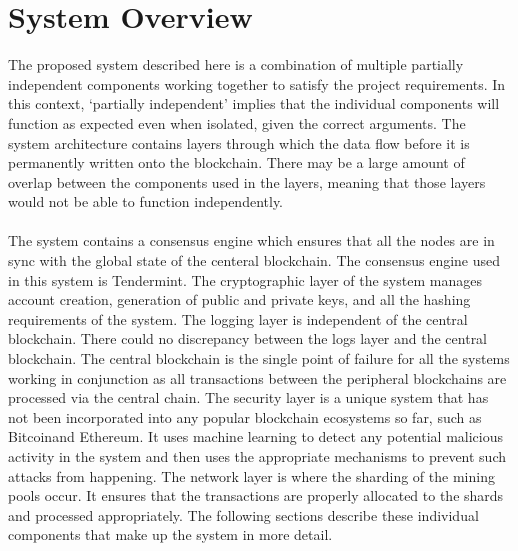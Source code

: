 \documentclass[a4paper,twoside,phd]{BYUPhys}
\begin{document}
\section{System Overview}
The proposed system described here is a combination of multiple partially independent components working together to satisfy the project requirements. In this context, `partially independent' implies that the individual components will function as expected even when isolated, given the correct arguments. The system architecture contains layers through which the data flow before it is permanently written onto the blockchain. There may be a large amount of overlap between the components used in the layers, meaning that those layers would not be able to function independently. 
\\
\\
The system contains a consensus engine which ensures that all the nodes are in sync with the global state of the centeral blockchain. The consensus engine used in this system is Tendermint. The cryptographic layer of the system manages account creation, generation of public and private keys, and all the hashing requirements of the system. The logging layer is independent of the central blockchain. There could no discrepancy between the logs layer and the central blockchain. The central blockchain is the single point of failure for all the systems working in conjunction as all transactions between the peripheral blockchains are processed via the central chain. The security layer is a unique system that has not been incorporated into any popular blockchain ecosystems so far, such as Bitcoin\cite{NakamotoBitcoin:System}and Ethereum\cite{ButerinAPLATFORM}. It uses machine learning to detect any potential malicious activity in the system and then uses the appropriate mechanisms to prevent such attacks from happening. The network layer is where the sharding of the mining pools occur. It ensures that the transactions are properly allocated to the shards and processed appropriately. The following sections describe these individual components that make up the system in more detail.
\end{document}
